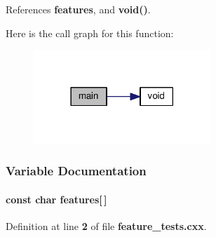 References {\bf features}, and {\bf void()}.



Here is the call graph for this function\+:
\nopagebreak
\begin{figure}[H]
\begin{center}
\leavevmode
\includegraphics[width=189pt]{df/d69/gr-radar-dev_2build_2CMakeFiles_2feature__tests_8cxx_a3c04138a5bfe5d72780bb7e82a18e627_cgraph}
\end{center}
\end{figure}




\subsubsection{Variable Documentation}
\paragraph[{features}]{\setlength{\rightskip}{0pt plus 5cm}const char features[$\,$]}\label{gr-radar-dev_2build_2CMakeFiles_2feature__tests_8cxx_a1582568e32f689337602a16bf8a5bff0}


Definition at line {\bf 2} of file {\bf feature\+\_\+tests.\+cxx}.

